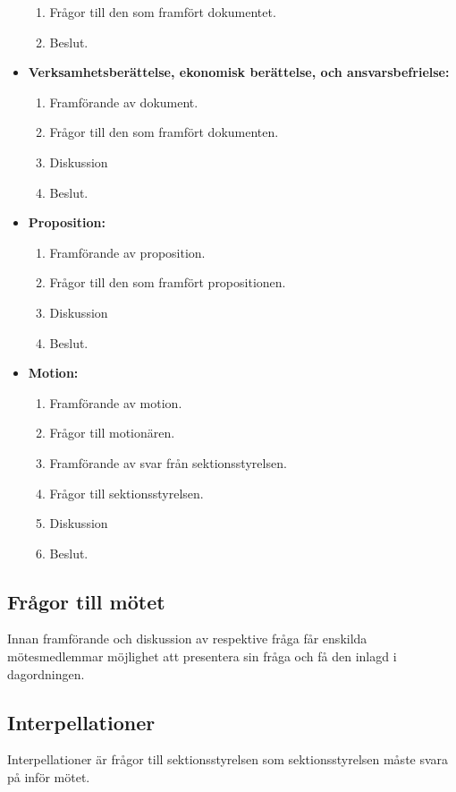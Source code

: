 \documentclass[11pt, includeaddress]{classes/cthit}
\begin{document}
\begin{itemize}
\begin{enumerate}
        \item Frågor till den som framfört dokumentet.
        \item Beslut.
    \end{enumerate}
    \item \textbf{Verksamhetsberättelse, ekonomisk berättelse, och ansvarsbefrielse:}
    \begin{enumerate}
        \item Framförande av dokument.
        \item Frågor till den som framfört dokumenten.
        \item Diskussion
        \item Beslut.
    \end{enumerate}
    \item \textbf{Proposition:}
    \begin{enumerate}
        \item Framförande av proposition.
        \item Frågor till den som framfört propositionen.
        \item Diskussion
        \item Beslut.
    \end{enumerate}
    \item \textbf{Motion:}
    \begin{enumerate}
        \item Framförande av motion.
        \item Frågor till motionären.
        \item Framförande av svar från sektionsstyrelsen.
        \item Frågor till sektionsstyrelsen.
        \item Diskussion
        \item Beslut.
    \end{enumerate}
\end{itemize}
\subsection{Frågor till mötet}
Innan framförande och diskussion av respektive fråga får enskilda mötesmedlemmar möjlighet att presentera sin fråga och få den inlagd i dagordningen.
\subsection{Interpellationer}
Interpellationer är frågor till sektionsstyrelsen som sektionsstyrelsen måste svara på inför mötet.
\end{document}
